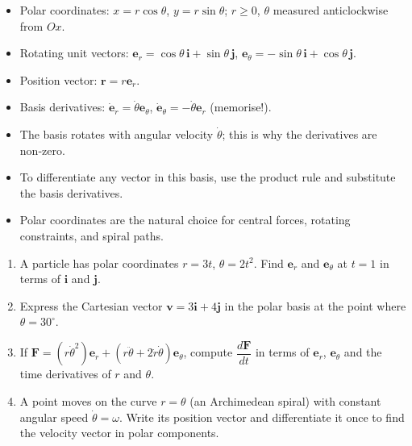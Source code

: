 \documentclass[11pt]{article}
\begin{document}
\begin{aretenir}
\begin{itemize}
  \item Polar coordinates: $x = r\cos\theta$, $y = r\sin\theta$; $r\ge 0$, $\theta$ measured anticlockwise from $Ox$.
  \item Rotating unit vectors: $\mathbf{e}_r = \cos\theta\,\mathbf{i}+\sin\theta\,\mathbf{j}$, $\mathbf{e}_\theta = -\sin\theta\,\mathbf{i}+\cos\theta\,\mathbf{j}$.
  \item Position vector: $\mathbf{r} = r\mathbf{e}_r$.
  \item Basis derivatives: $\dot{\mathbf{e}}_r = \dot{\theta}\mathbf{e}_\theta$, $\dot{\mathbf{e}}_\theta = -\dot{\theta}\mathbf{e}_r$ (memorise!).
  \item The basis rotates with angular velocity $\dot{\theta}$; this is why the derivatives are non‑zero.
  \item To differentiate any vector in this basis, use the product rule and substitute the basis derivatives.
  \item Polar coordinates are the natural choice for central forces, rotating constraints, and spiral paths.
\end{itemize}
\end{aretenir}

\begin{exercice}[Practice]
\begin{enumerate}
  \item A particle has polar coordinates $r = 3t$, $\theta = 2t^2$. Find $\mathbf{e}_r$ and $\mathbf{e}_\theta$ at $t=1$ in terms of $\mathbf{i}$ and $\mathbf{j}$.
  \item Express the Cartesian vector $\mathbf{v} = 3\mathbf{i} + 4\mathbf{j}$ in the polar basis at the point where $\theta = 30^\circ$.
  \item If $\mathbf{F} = (r\dot{\theta}^2)\mathbf{e}_r + (r\ddot{\theta}+2\dot{r}\dot{\theta})\mathbf{e}_\theta$, compute $\dfrac{d\mathbf{F}}{dt}$ in terms of $\mathbf{e}_r$, $\mathbf{e}_\theta$ and the time derivatives of $r$ and $\theta$.
  \item A point moves on the curve $r = \theta$ (an Archimedean spiral) with constant angular speed $\dot{\theta} = \omega$. Write its position vector and differentiate it once to find the velocity vector in polar components.
\end{enumerate}
\end{exercice}
\end{document}
